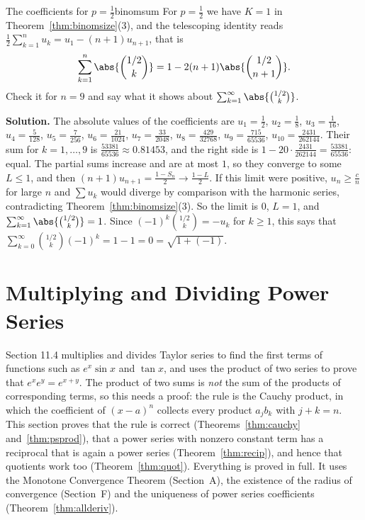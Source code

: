 \documentclass[11pt]{article}
\begin{document}
\begin{exmp}{The coefficients for $p=\frac12$}{binomsum}
For $p=\frac12$ we have $K=1$ in Theorem~\ref{thm:binomsize}(3), and the telescoping identity reads $\frac12\sum_{k=1}^nu_k=u_1-(n+1)u_{n+1}$, that is
\[
\sum_{k=1}^n\abs{\binom{1/2}k}=1-2(n+1)\abs{\binom{1/2}{n+1}} .
\]
Check it for $n=9$ and say what it shows about $\sum_{k=1}^\infty\abs{\binom{1/2}k}$.

\textbf{Solution.} The absolute values of the coefficients are $u_1=\frac12$, $u_2=\frac18$, $u_3=\frac1{16}$, $u_4=\frac5{128}$, $u_5=\frac7{256}$, $u_6=\frac{21}{1024}$, $u_7=\frac{33}{2048}$, $u_8=\frac{429}{32768}$, $u_9=\frac{715}{65536}$, $u_{10}=\frac{2431}{262144}$. Their sum for $k=1,\dots,9$ is $\frac{53381}{65536}\approx0.81453$, and the right side is $1-20\cdot\frac{2431}{262144}=\frac{53381}{65536}$: equal. The partial sums increase and are at most $1$, so they converge to some $L\le1$, and then $(n+1)u_{n+1}=\frac{1-S_n}2\to\frac{1-L}2$. If this limit were positive, $u_n\ge\frac cn$ for large $n$ and $\sum u_k$ would diverge by comparison with the harmonic series, contradicting Theorem~\ref{thm:binomsize}(3). So the limit is $0$, $L=1$, and $\sum_{k=1}^\infty\abs{\binom{1/2}k}=1$. Since $(-1)^k\binom{1/2}k=-u_k$ for $k\ge1$, this says that $\sum_{k=0}^\infty\binom{1/2}k(-1)^k=1-1=0=\sqrt{1+(-1)}$.
\end{exmp}

\section{Multiplying and Dividing Power Series}

Section 11.4 multiplies and divides Taylor series to find the first terms of functions such as $e^x\sin x$ and $\tan x$, and uses the product of two series to prove that $e^xe^y=e^{x+y}$. The product of two sums is \emph{not} the sum of the products of corresponding terms, so this needs a proof: the rule is the Cauchy product, in which the coefficient of $(x-a)^n$ collects every product $a_jb_k$ with $j+k=n$. This section proves that the rule is correct (Theorems~\ref{thm:cauchy} and~\ref{thm:psprod}), that a power series with nonzero constant term has a reciprocal that is again a power series (Theorem~\ref{thm:recip}), and hence that quotients work too (Theorem~\ref{thm:quot}). Everything is proved in full. It uses the Monotone Convergence Theorem (Section~A), the existence of the radius of convergence (Section~F) and the uniqueness of power series coefficients (Theorem~\ref{thm:allderiv}).
\end{document}

